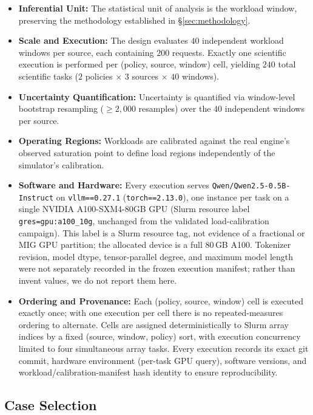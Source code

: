 \begin{itemize}
  \item \textbf{Inferential Unit:} The statistical unit of analysis is the workload window, preserving the methodology established in \S\ref{sec:methodology}.
  \item \textbf{Scale and Execution:} The design evaluates $40$ independent workload windows per source, each containing $200$ requests. Exactly one scientific execution is performed per (policy, source, window) cell, yielding $240$ total scientific tasks ($2$ policies $\times$ $3$ sources $\times$ $40$ windows).
  \item \textbf{Uncertainty Quantification:} Uncertainty is quantified via window-level bootstrap resampling ($\ge 2{,}000$ resamples) over the $40$ independent windows per source.
  \item \textbf{Operating Regions:} Workloads are calibrated against the real engine's observed saturation point to define load regions independently of the simulator's calibration.
  \item \textbf{Software and Hardware:} Every execution serves \texttt{Qwen/Qwen2.5-0.5B-Instruct} on \texttt{vllm==0.27.1} (\texttt{torch==2.13.0}), one instance per task on a single NVIDIA A100-SXM4-80GB GPU (Slurm resource label \texttt{gres=gpu:a100\_10g}, unchanged from the validated load-calibration campaign). This label is a Slurm resource tag, not evidence of a fractional or MIG GPU partition; the allocated device is a full 80\,GB A100. Tokenizer revision, model dtype, tensor-parallel degree, and maximum model length were not separately recorded in the frozen execution manifest; rather than invent values, we do not report them here.
  \item \textbf{Ordering and Provenance:} Each (policy, source, window) cell is executed exactly once; with one execution per cell there is no repeated-measures ordering to alternate. Cells are assigned deterministically to Slurm array indices by a fixed (source, window, policy) sort, with execution concurrency limited to four simultaneous array tasks. Every execution records its exact git commit, hardware environment (per-task GPU query), software versions, and workload/calibration-manifest hash identity to ensure reproducibility.
\end{itemize}

\subsection{Case Selection}
\label{sec:real-system-case-selection}

